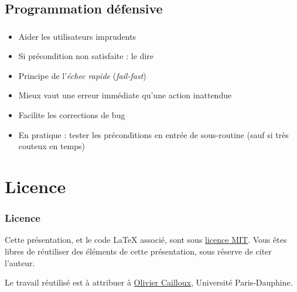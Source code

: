 \documentclass[english, french]{beamer}
\begin{document}
\subsection{Programmation défensive}
\begin{frame}
	\frametitle{\subsecname}
	\begin{itemize}
		\item Aider les utilisateurs imprudents
		\item Si précondition non satisfaite : le dire
		\item Principe de l’\emph{échec rapide} (\emph{fail-fast})
		\item Mieux vaut une erreur immédiate qu’une action inattendue
		\item Facilite les corrections de bug
		\item En pratique : tester les préconditions en entrée de sous-routine {\tiny (sauf si très couteux en temps)}
	\end{itemize}
\end{frame}

\appendix
\section{Licence}
\begin{frame}
	\frametitle{Licence}
	Cette présentation, et le code LaTeX associé, sont sous \href{http://opensource.org/licenses/MIT}{licence MIT}. Vous êtes libres de réutiliser des éléments de cette présentation, sous réserve de citer l’auteur.
	
	Le travail réutilisé est à attribuer à \href{http://www.lamsade.dauphine.fr/~ocailloux/}{Olivier Cailloux}, Université Paris-Dauphine.
\end{frame}
\end{document}
